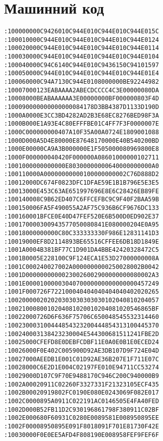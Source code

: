 
\chapter{Машинний код}
\thispagestyle{headings}

\begin{lstlisting}[language={}, basicstyle=\scriptsize, caption=Машинний код]
:100000000C9426010C944E010C944E010C944E015C
:100010000C944E010C944E010C944E010C944E0124
:100020000C944E010C944E010C944E010C944E0114
:100030000C944E010C944E010C944E010C944E0104
:100040000C94C6140C944E010C9436150C94101597
:100050000C944E010C944E010C944E010C944E01E4
:100060000C94A7130C944E0108000000BE92244982
:10007000123EABAAAA2ABECDCCCC4C3E00000080DA
:10008000BEABAAAAAA3E00000000BF000000803F4D
:100090000000000000084178D3BB4387D1133D190D
:1000A0000E3CC3BD4282AD2B3E68EC8276BED98F3A
:1000B000E1A93E4C80EFFFBE01C4FF7F3F0000007E
:1000C000000000407A10F35A00A0724E1809001088
:1000D000A5D4E80000E87648170000E40B540200BD
:1000E00000CA9A3B000000E1F505000080969800E8
:1000F000000040420F000000A08601000000102711
:1001000000000000E80300000000640000000000A0
:100110000A00000000000100000000002C76D888D2
:10012000DC674F0823DFC1DFAE59E1B1B796E5E3E5
:10013000E453C63AE651997696E8E6C28426EB89FE
:100140008C9B62ED407C6FFCEFBC9C9F40F2BAA59B
:100150006FA5F490055A2AF75C936B6CF9676DC133
:100160001BFCE0E40D47FEF520E6B500D0ED902E37
:100170000300943577050080841E080000204E0A95
:10018000000000C80C333333330F986E12831141D3
:10019000EF8D2114893BE65516CFFEE6DB18D1849E
:1001A0004B381BF77C1D901DA4BBE42420328472C5
:1001B0005E228100C9F124ECA1E53D27000000008A
:1001C000240027002A0000000000250028002B0042
:1001D00000000000230026002900000000080002A3
:1001E0000100000304070000000000000000457249
:1001F000726F722100040404040404040402020265
:100200000202020303030303030102040810204057
:1002100080010204081020010204081020546865BF
:10022000726D6F636F75706C650048545532314460
:100230003100444854323200444854313100445370
:100240003138423230004E544300681511241FBE2D
:10025000CFEFD8E0DEBFCDBF11E0A0E0B1E0ECED24
:10026000F0E402C005900D92AE3DB107D9F724E04D
:10027000AEEDB1E001C01D92AE36B207E1F711E07C
:10028000C6E2D1E004C02197FE010E94711CC53274
:10029000D107C9F70E9488170C946C200C940000B9
:1002A00020911C02260F3327331F21323105ECF435
:1002B00020919802FC0190E080E0243069F082E017
:1002C0000895A0911C022191AC0146505E4FA40FED
:1002D000B52FB11D2C930196861798F380911C02BF
:1002E000680F60931C0280E0089581E008950895EE
:1002F00008950895E091F8018091F701E81730F42E
:10030000F0E0EE5AFD4F808190E008958FEF9FEF6F

\end{lstlisting}
